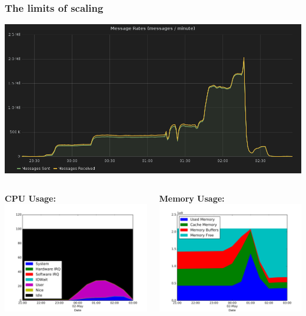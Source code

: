 \documentclass[aspectratio=169,11pt,hyperref={colorlinks=true}]{beamer}
\begin{document}
\begin{frame}
    \frametitle{The limits of scaling}
    \centering
    \includegraphics[width=.9\textwidth]{manual-load-test.png}
\end{frame}

\begin{frame}
    \begin{columns}[T]
        \begin{column}{.48\textwidth}
            \textbf{CPU Usage:}\\
            \includegraphics[width=\textwidth]{manual_load_cpu_usage.png}
        \end{column}
        \begin{column}{.48\textwidth}
            \textbf{Memory Usage:}\\
            \includegraphics[width=\textwidth]{manual_load_ram_usage.png}

\end{column}
\end{columns}
\end{frame}
\end{document}
